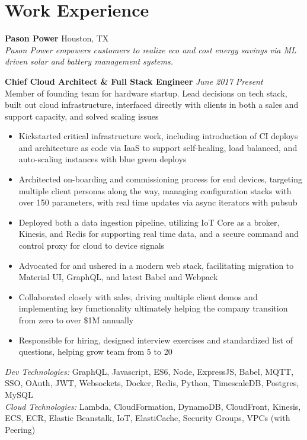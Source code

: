 \documentclass[10pt]{article}
\begin{document}
\section*{Work Experience}
\textbf{Pason Power} \hfill Houston, TX \\
\textit{Pason Power empowers customers to realize eco and cost energy savings via ML driven solar and battery management systems.} \\
\begin{addmargin}[1em]{0em}
  \textbf{Chief Cloud Architect \& Full Stack Engineer} \hfill \textit{June 2017 \textendash{} Present} \\
  Member of founding team for hardware startup. Lead decisions on tech stack, built out cloud infrastructure, interfaced directly with clients in both a sales and support capacity, and solved scaling issues  \\
  \vspace{-1.1em}
  \begin{itemize}
    \item Kickstarted critical infrastructure work, including introduction of CI deploys and architecture as code via IaaS to support self-healing, load balanced, and auto-scaling instances with blue green deploys
    \item Architected on-boarding and commissioning process for end devices, targeting multiple client personas along the way, managing configuration stacks with over 150 parameters, with real time updates via async iterators with pubsub
    \item Deployed both a data ingestion pipeline, utilizing IoT Core as a broker, Kinesis, and Redis for supporting real time data, and a secure command and control proxy for cloud to device signals
    \item Advocated for and ushered in a modern web stack, facilitating migration to Material UI, GraphQL, and latest Babel and Webpack
    \item Collaborated closely with sales, driving multiple client demos and implementing key functionality ultimately helping the company transition from zero to over \$1M annually
    \item Responsible for hiring, designed interview exercises and standardized list of questions, helping grow team from 5 to 20
  \end{itemize}
  \textit{Dev Technologies:} GraphQL, Javascript, ES6, Node, ExpressJS, Babel, MQTT, SSO, OAuth, JWT, Websockets, Docker, Redis, Python, TimescaleDB, Postgres, MySQL \\
  \textit{Cloud Technologies:} Lambda, CloudFormation, DynamoDB, CloudFront, Kinesis, ECS, ECR, Elastic Beanstalk, IoT, ElastiCache, Security Groups, VPCs (with Peering)
\end{addmargin}
\end{document}

